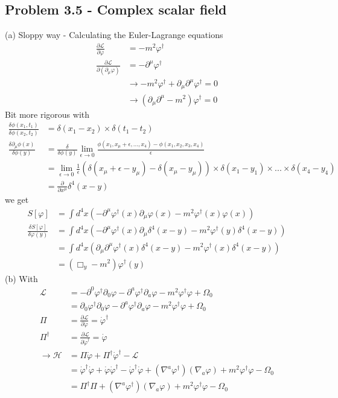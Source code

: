 \documentclass[10pt,a4paper]{book}
\theoremstyle{definition}
\begin{document}
\subsection{Problem 3.5 - Complex scalar field}
(a) Sloppy way - Calculating the Euler-Lagrange equations
\begin{align}
\frac{\partial\mathcal{L}}{\partial\varphi}
&=-m^2\varphi^\dagger\\
\frac{\partial\mathcal{L}}{\partial(\partial_\mu\varphi)}&=-\partial^\mu\varphi^\dagger\\
&\rightarrow -m^2\varphi^\dagger+\partial_\mu\partial^\mu\varphi^\dagger=0\\
&\rightarrow (\partial_\mu\partial^\mu-m^2)\varphi^\dagger=0
\end{align}
Bit more rigorous with
\begin{align}
\frac{\delta\phi(x_1,t_1)}{\delta\phi(x_2,t_2)}&=\delta(x_1-x_2)\times\delta(t_1-t_2)\\
\frac{\delta\partial_\mu\phi(x)}{\delta\phi(y)}&=\frac{\delta}{\delta\phi(y)}\lim_{\epsilon\rightarrow0}\frac{\phi(x_1,x_\mu+\epsilon,...,x_4)-\phi(x_1,x_2,x_3,x_4)}{\epsilon}\\
&=\lim_{\epsilon\rightarrow0}\frac{1}{\epsilon}\left(\delta(x_\mu+\epsilon-y_\mu)-\delta(x_\mu-y_\mu)\right)\times\delta(x_1-y_1)\times...\times\delta(x_4-y_4)\\
&=\frac{\partial}{\partial x^\mu}\delta^4(x-y)
\end{align}
we get
\begin{align}
S[\varphi]
&=\int d^4x\left(-\partial^\mu\varphi^\dagger(x)\partial_\mu\varphi(x)-m^2\varphi^\dagger(x)\varphi(x)\right)\\
\frac{\delta S[\varphi]}{\delta\varphi(y)}
&=\int d^4x\left(-\partial^\mu\varphi^\dagger(x)\partial_\mu\delta^4(x-y)-m^2\varphi^\dagger(y)\delta^4(x-y)\right)\\
&=\int d^4x\left(\partial_\mu\partial^\mu\varphi^\dagger(x)\delta^4(x-y)-m^2\varphi^\dagger(x)\delta^4(x-y)\right)\\
&=(\Box_y-m^2)\varphi^\dagger(y)
\end{align}
(b) With
\begin{align}
\mathcal{L}
&=-\partial^0\varphi^\dagger\partial_0\varphi-\partial^a\varphi^\dagger\partial_a\varphi-m^2\varphi^\dagger\varphi+\Omega_0\\
&=\partial_0\varphi^\dagger\partial_0\varphi-\partial^a\varphi^\dagger\partial_a\varphi-m^2\varphi^\dagger\varphi+\Omega_0\\
\Pi&=\frac{\partial\mathcal{L}}{\partial\dot\varphi}
=\dot\varphi^\dagger\\
\Pi^\dagger&=\frac{\partial\mathcal{L}}{\partial\dot\varphi^\dagger}
=\dot\varphi\\
\rightarrow\mathcal{H}&=\Pi\dot\varphi+\Pi^\dagger\dot\varphi^\dagger-\mathcal{L}\\
&=\dot\varphi^\dagger\dot\varphi+\dot\varphi\dot\varphi^\dagger-\dot\varphi^\dagger\dot\varphi+(\nabla^a\varphi^\dagger)(\nabla_a\varphi)+m^2\varphi^\dagger\varphi-\Omega_0\\
&=\Pi^\dagger\Pi+(\nabla^a\varphi^\dagger)(\nabla_a\varphi)+m^2\varphi^\dagger\varphi-\Omega_0
\end{align}
\end{document}
